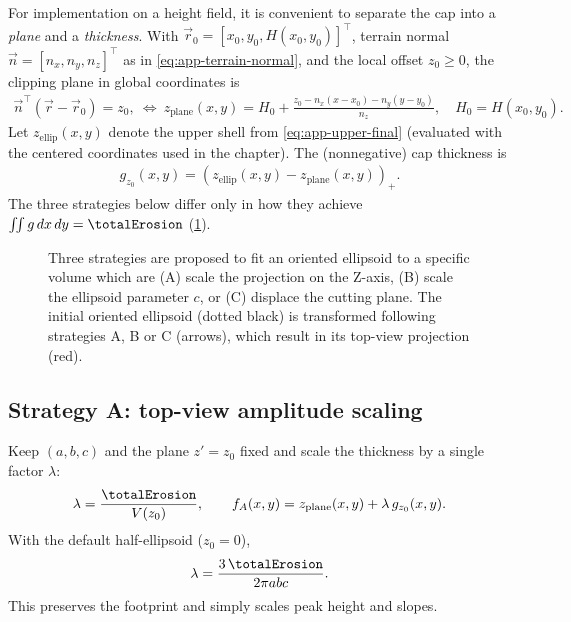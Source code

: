 For implementation on a height field, it is convenient to separate the cap into a \emph{plane} and a \emph{thickness}. With $\vec r_0=[x_0,y_0,H(x_0,y_0)]^\top$, terrain normal $\vec n=[n_x,n_y,n_z]^\top$ as in \cref{eq:app-terrain-normal}, and the local offset $z_0\ge 0$, the clipping plane in global coordinates is
\begin{align}
    \label{eq:app-cap-plane}
    \vec n^\top(\vec r-\vec r_0)=z_0,
    \ \Longleftrightarrow\
    z_{\text{plane}}(x,y)=H_0+\frac{z_0-n_x(x-x_0)-n_y(y-y_0)}{n_z},\quad H_0=H(x_0,y_0).
\end{align}
Let $z_{\text{ellip}}(x,y)$ denote the upper shell from \cref{eq:app-upper-final} (evaluated with the centered coordinates used in the chapter). The (nonnegative) cap thickness is
\begin{align}
    \label{eq:app-cap-thickness}
    g_{z_0}(x,y)=\left(z_{\text{ellip}}(x,y)-z_{\text{plane}}(x,y)\right)_+.
\end{align}
The three strategies below differ only in how they achieve $\iint g\,dx\,dy=\totalErosion$ (\cref{fig:ellipsoid-strategies}).

\begin{figure}
    \caption{Three strategies are proposed to fit an oriented ellipsoid to a specific volume which are (A) scale the projection on the Z-axis, (B) scale the ellipsoid parameter $c$, or (C) displace the cutting plane. The initial oriented ellipsoid (dotted black) is transformed following strategies A, B or C (arrows), which result in its top-view projection (red). }
    \label{fig:ellipsoid-strategies}
\end{figure}

\subsection*{Strategy A: top-view amplitude scaling}
Keep $(a,b,c)$ and the plane $z'=z_0$ fixed and scale the thickness by a single factor $\lambda$:
\begin{align}
    \label{eq:app-stratA}
    \lambda=\frac{\totalErosion}{V(z_0)},\qquad
    f_A(x,y)=z_{\text{plane}}(x,y)+\lambda\,g_{z_0}(x,y).
\end{align}
With the default half-ellipsoid ($z_0=0$),
\begin{align}
    \lambda=\frac{3\,\totalErosion}{2\pi a b c}.
\end{align}
This preserves the footprint and simply scales peak height and slopes.

